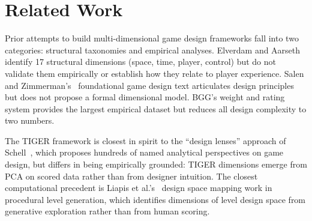 \section{Related Work}
\label{sec:related}

Prior attempts to build multi-dimensional game design frameworks fall into two categories:
structural taxonomies and empirical analyses. Elverdam and Aarseth~\cite{elverdam2007game}
identify 17 structural dimensions (space, time, player, control) but do not validate
them empirically or establish how they relate to player experience. Salen and
Zimmerman's~\cite{salen2003rules} foundational game design text articulates design
principles but does not propose a formal dimensional model. BGG's weight and rating system
provides the largest empirical dataset but reduces all design complexity to two numbers.

The TIGER framework is closest in spirit to the ``design lenses'' approach of Schell~\cite{schell2008art},
which proposes hundreds of named analytical perspectives on game design, but differs in
being empirically grounded: TIGER dimensions emerge from PCA on scored data rather than
from designer intuition. The closest computational precedent is Liapis et al.'s~\cite{liapis2013sentient}
design space mapping work in procedural level generation, which identifies dimensions
of level design space from generative exploration rather than from human scoring.
